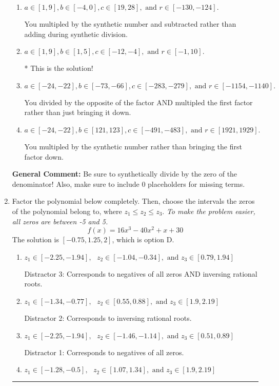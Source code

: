 \documentclass{extbook}[14pt]
\newcommand{\litem}[1]{\item #1

\rule{\textwidth}{0.4pt}}
\begin{document}
\begin{enumerate}
{\begin{enumerate}[label=\Alph*.]
 You divided by the opposite of the factor.
\item \( a \in [1, 9], b \in [-4, 0], c \in [19, 28], \text{ and } r \in [-130, -124]. \)

 You multipled by the synthetic number and subtracted rather than adding during synthetic division.
\item \( a \in [1, 9], b \in [1, 5], c \in [-12, -4], \text{ and } r \in [-1, 10]. \)

* This is the solution!
\item \( a \in [-24, -22], b \in [-73, -66], c \in [-283, -279], \text{ and } r \in [-1154, -1140]. \)

 You divided by the opposite of the factor AND multipled the first factor rather than just bringing it down.
\item \( a \in [-24, -22], b \in [121, 123], c \in [-491, -483], \text{ and } r \in [1921, 1929]. \)

 You multipled by the synthetic number rather than bringing the first factor down.
\end{enumerate}

\textbf{General Comment:} Be sure to synthetically divide by the zero of the denominator! Also, make sure to include 0 placeholders for missing terms.
}
\litem{
Factor the polynomial below completely. Then, choose the intervals the zeros of the polynomial belong to, where $z_1 \leq z_2 \leq z_3$. \textit{To make the problem easier, all zeros are between -5 and 5.}
\[ f(x) = 16x^{3} -40 x^{2} +x + 30 \]The solution is \( [-0.75, 1.25, 2] \), which is option D.\begin{enumerate}[label=\Alph*.]
\item \( z_1 \in [-2.25, -1.94], \text{   }  z_2 \in [-1.04, -0.34], \text{   and   } z_3 \in [0.79, 1.94] \)

 Distractor 3: Corresponds to negatives of all zeros AND inversing rational roots.
\item \( z_1 \in [-1.34, -0.77], \text{   }  z_2 \in [0.55, 0.88], \text{   and   } z_3 \in [1.9, 2.19] \)

 Distractor 2: Corresponds to inversing rational roots.
\item \( z_1 \in [-2.25, -1.94], \text{   }  z_2 \in [-1.46, -1.14], \text{   and   } z_3 \in [0.51, 0.89] \)

 Distractor 1: Corresponds to negatives of all zeros.
\item \( z_1 \in [-1.28, -0.5], \text{   }  z_2 \in [1.07, 1.34], \text{   and   } z_3 \in [1.9, 2.19] \)


\end{enumerate}}
\end{enumerate}
\end{document}
